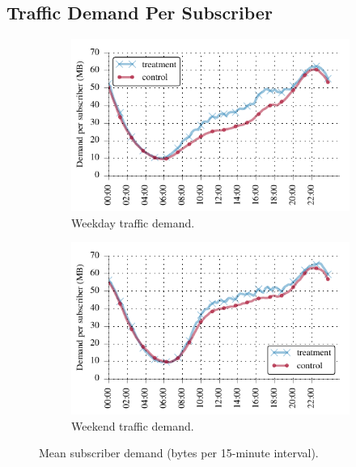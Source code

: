 \subsection{Traffic Demand Per Subscriber}\label{subsec:behavior}

\begin{figure}[t]
\begin{minipage}{\linewidth}
\centering
%
\begin{subfigure}[b]{.49\linewidth}
\includegraphics[width=\linewidth]{figures/weekday_demand_mean.pdf}
               \caption{Weekday traffic demand.\label{fig:weekday-daily-usage}}
\end{subfigure}
%
\begin{subfigure}[b]{.49\linewidth}
\includegraphics[width=\linewidth]{figures/weekend_demand_mean.pdf}
               \caption{Weekend traffic demand.\label{fig:weekend-daily-usage}}
\end{subfigure}
%
\end{minipage}
\caption{Mean subscriber demand (bytes per 15-minute interval).}
\label{fig:traffic-demand-timeseries}
\end{figure}

